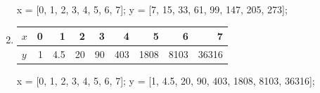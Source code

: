 \documentclass[12pt,a4paper]{article}
\begin{document}
\begin{enumerate}
\begin{tabular}[t]{l|rrrrrrrr}
                \end{tabular}
                \begin{paste}
    x = [0, 1, 2, 3, 4, 5, 6, 7];
    y = [7, 15, 33, 61, 99, 147, 205, 273];
                \end{paste}
            \item\label{T:hw-5-4}
                \begin{tabular}[t]{l|rrrrrrrr}
                    $x$ & 0 & 1   & 2  & 3  & 4   & 5    & 6    & 7     \\ \hline
                    $y$ & 1 & 4.5 & 20 & 90 & 403 & 1808 & 8103 & 36316 \\
                \end{tabular}
                \begin{paste}
    x = [0, 1, 2, 3, 4, 5, 6, 7];
    y = [1, 4.5, 20, 90, 403, 1808, 8103, 36316];
                \end{paste}
        \end{enumerate}
        \newpage
\end{document}
